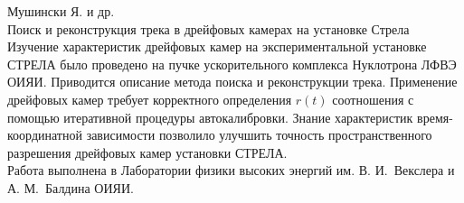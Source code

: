 
\thispagestyle{empty}

\noindent
Мушински Я. и др.\\
Поиск и реконструкция трека в дрейфовых камерах на установке Стрела \\

Изучение характеристик дрейфовых камер на экспериментальной установке СТРЕЛА
было проведено на пучке ускорительного комплекса Нуклотрона ЛФВЭ ОИЯИ.
Приводится описание метода поиска и реконструкции трека. Применение дрейфовых
камер требует корректного определения $r(t)$ соотношения с помощью итеративной
процедуры автокалибровки. Знание характеристик время-координатной зависимости
позволило улучшить точность пространственного разрешения дрейфовых камер
установки СТРЕЛА. \\

Работа выполнена в Лаборатории физики высоких энергий им. В. И.~Векслера и
А. М.~Балдина ОИЯИ.



